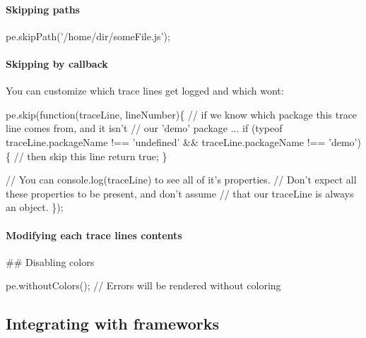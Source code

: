 \paragraph*{Skipping paths}


\begin{DoxyCode}
pe.skipPath('/home/dir/someFile.js');
\end{DoxyCode}


\paragraph*{Skipping by callback}

You can customize which trace lines get logged and which won\textquotesingle{}t\+: 
\begin{DoxyCode}
pe.skip(function(traceLine, lineNumber)\{
   // if we know which package this trace line comes from, and it isn't
   // our 'demo' package ...
   if (typeof traceLine.packageName !== 'undefined' && traceLine.packageName !== 'demo') \{
      // then skip this line
      return true;
   \}

   // You can console.log(traceLine) to see all of it's properties.
   // Don't expect all these properties to be present, and don't assume
   // that our traceLine is always an object.
\});
\end{DoxyCode}


\paragraph*{Modifying each trace line\textquotesingle{}s contents}




\#\# Disabling colors 
\begin{DoxyCode}
pe.withoutColors(); // Errors will be rendered without coloring
\end{DoxyCode}


\subsection*{Integrating with frameworks}

